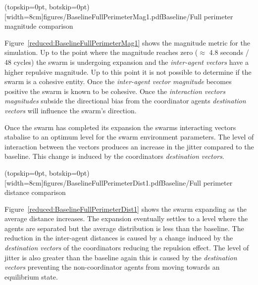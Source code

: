 \documentclass{ieeeaccess}
\begin{document}

\Figure[t!](topskip=0pt, botskip=0pt)[width=8cm]{figures/BaselineFullPerimeterMag1.pdf}{Baseline/Full perimeter magnitude comparison\label{reduced:BaselineFullPerimeterMag1}}

Figure~\ref{reduced:BaselineFullPerimeterMag1} shows the magnitude metric for the simulation. Up to the point where the magnitude reaches zero ($\approx$ 4.8 seconds / 48 cycles) the swarm is undergoing expansion and the \textit{inter-agent vectors} have a higher repulsive magnitude. Up to this point it is not possible to determine if the swarm is a cohesive entity. Once the \textit{inter-agent vector magnitude} becomes positive the swarm is known to be cohesive. Once the \textit{interaction vectors magnitudes} subside the directional bias from the coordinator agents \textit{destination vectors} will influence the swarm's direction. 

Once the swarm has completed its expansion the swarms interacting vectors stabalise to an optimum level for the swarm environment parameters. The level of interaction between the vectors produces an increase in the jitter compared to the baseline. This change is induced by the coordinators \textit{destination vectors}.


\Figure[t!](topskip=0pt, botskip=0pt)[width=8cm]{figures/BaselineFullPerimeterDist1.pdf}{Baseline/Full perimeter distance comparison\label{reduced:BaselineFullPerimeterDist1}}

Figure~\ref{reduced:BaselineFullPerimeterDist1} shows the swarm expanding as the average distance increases. The expansion eventually settles to a level where the agents are separated but the average distribution is less than the baseline. The reduction in the inter-agent distances is caused by a change induced by the \textit{destination vectors} of the coordinators reducing the repulsion effect. The level of jitter is also greater than the baseline again this is caused by the \textit{destination vectors} preventing the non-coordinator agents from moving towards an equilibrium state.
\end{document}
